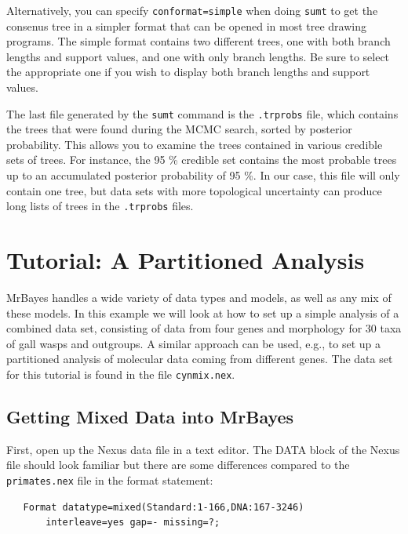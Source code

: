 \documentclass[12pt]{book}
\begin{document}
Alternatively, you can specify \texttt{conformat=simple} when doing \texttt{sumt} to get the consenus tree
in a simpler format that can be opened in most tree drawing programs. The simple format contains two
different trees, one with both branch lengths and support values, and one with only branch lengths. 
Be sure to select the appropriate one if you wish to display both branch lengths and support values.

The last file generated by the \texttt{sumt} command is the \texttt{.trprobs} file, which contains the trees 
that were found during the MCMC search, sorted by posterior probability. This allows you to examine the 
trees contained in various credible sets of trees. For instance, the 95 \% credible set contains the most 
probable trees up to an accumulated posterior probability of 95 \%. In our case, this file will only contain 
one tree, but data sets with more topological uncertainty can produce long lists of trees in the 
\texttt{.trprobs} files.

\chapter{Tutorial: A Partitioned Analysis}
\label{tutorialPartitioned}
MrBayes handles a wide variety of data types and models, as well as any mix of these models. In this example 
we will look at how to set up a simple analysis of a combined data set, consisting of data from four genes 
and morphology for 30 taxa of gall wasps and outgroups. A similar approach can be used, e.g., to set up a 
partitioned analysis of molecular data coming from different genes. The data set for this tutorial is found 
in the file \texttt{cynmix.nex}.

\section{Getting Mixed Data into MrBayes}

First, open up the Nexus data file in a text editor. The DATA block of the Nexus file should look familiar 
but there are some differences compared to the \texttt{primates.nex} file in the format statement:

\begin{singlespacing}
\small
\begin{verbatim}
   Format datatype=mixed(Standard:1-166,DNA:167-3246)
       interleave=yes gap=- missing=?;
\end{verbatim}
\normalsize
\end{singlespacing}
\end{document}
